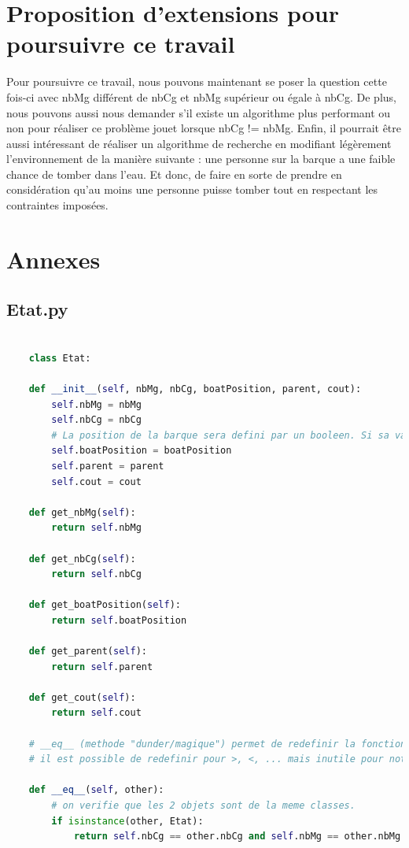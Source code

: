 \documentclass[a4paper, 12pt, french, oneside]{book}
\begin{document}
\chapter{Proposition d'extensions pour poursuivre ce travail}
Pour poursuivre ce travail, nous pouvons maintenant se poser la question cette fois-ci avec nbMg différent de nbCg et nbMg supérieur ou égale à nbCg. De plus, nous pouvons aussi nous demander s'il existe un algorithme plus performant ou non pour réaliser ce problème jouet lorsque nbCg != nbMg.
Enfin, il pourrait être aussi intéressant de réaliser un algorithme de recherche en modifiant légèrement l'environnement de la manière suivante : une personne sur la barque a une faible chance de tomber dans l'eau. Et donc, de faire en sorte de prendre en considération qu'au moins une personne puisse tomber tout en respectant les contraintes imposées.

\appendix
\chapter{Annexes}
\section{Etat.py}
\begin{lstlisting}[language=Python, caption=Python example] 

    class Etat:

    def __init__(self, nbMg, nbCg, boatPosition, parent, cout):
        self.nbMg = nbMg
        self.nbCg = nbCg
        # La position de la barque sera defini par un booleen. Si sa valeur est egale a vraie alors la barque est a guache sinon elle est a droite
        self.boatPosition = boatPosition
        self.parent = parent
        self.cout = cout

    def get_nbMg(self):
        return self.nbMg

    def get_nbCg(self):
        return self.nbCg

    def get_boatPosition(self):
        return self.boatPosition

    def get_parent(self):
        return self.parent

    def get_cout(self):
        return self.cout

    # __eq__ (methode "dunder/magique") permet de redefinir la fonction ==. Cela nous sera utile pour verifie si 2 etats sont egaux. (fonctionne avec .remove() pour la comparaison d'etat)
    # il est possible de redefinir pour >, <, ... mais inutile pour notre cas.

    def __eq__(self, other):
        # on verifie que les 2 objets sont de la meme classes.
        if isinstance(other, Etat):
            return self.nbCg == other.nbCg and self.nbMg == other.nbMg and self.boatPosition == other.boatPosition
\end{lstlisting}
\end{document}
